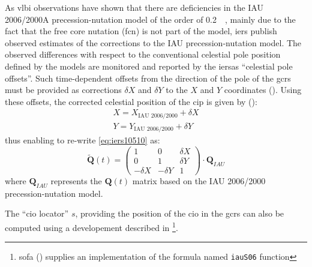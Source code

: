 As \gls{vlbi} observations have shown that there are deficiencies in the 
IAU 2006/2000A precession-nutation model of the order of \SI{0.2}{\milli\larcsecond}, 
mainly due to the fact that the free core nutation (\gls{fcn}) is not part of 
the model, \gls{iers} publish observed estimates of the corrections to the 
IAU precession-nutation model. The observed differences with respect to the 
conventional celestial pole position defined by the models are monitored and 
reported by the \gls{iers}as ``celestial pole offsets''. Such time-dependent 
offsets from the direction of the pole of the \gls{gcrs} must be provided as 
corrections $\delta X$ and $\delta Y$ to the $X$ and $Y$ coordinates (\cite{iers2010}).
Using these offsets, the corrected celestial position of the \gls{cip} is 
given by (\cite{iers2010}):
\begin{equation}
  \begin{aligned}
    X = X_{\text{IAU 2006/2000}} + \delta X \\
    Y = Y_{\text{IAU 2006/2000}} + \delta Y
  \end{aligned}
\end{equation}
thus enabling to re-write \ref{eq:iers10510} as:
\begin{equation}
  \bm{\tilde{Q}}(t) = \begin{pmatrix}
    1 & 0 & \delta X \\
    0 & 1 & \delta Y \\
    -\delta X & -\delta Y & 1
    \end{pmatrix}
    \cdot \bm{Q}_{IAU}
    \label{eq:iers10527}
\end{equation}
where $\bm{Q}_{IAU}$ represents the $\bm{Q}(t)$ matrix based on the IAU 2006/2000 
precession-nutation model.

The ``\gls{cio} locator'' $s$, providing the position of the \gls{cio} in the 
\gls{gcrs} can also be computed using a developement described in \cite{Capitaineetal2003a}\footnote{\gls{sofa} (\cite{SOFA20210125}) supplies an implementation of the formula named \texttt{iauS06} function}.

